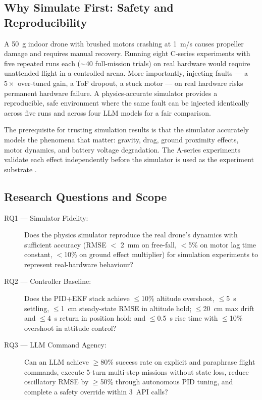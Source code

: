 \subsection{Why Simulate First: Safety and Reproducibility}
\label{sec:ch3_problem_sim}

A 50~g indoor drone with brushed motors crashing at 1~m/s causes propeller
damage and requires manual recovery. Running eight C-series experiments with
five repeated runs each ($\sim$40 full-mission trials) on real hardware would
require unattended flight in a controlled arena. More importantly, injecting
faults --- a $5\times$ over-tuned gain, a ToF dropout, a stuck motor ---
on real hardware risks permanent hardware failure. A physics-accurate simulator
provides a reproducible, safe environment where the same fault can be injected
identically across five runs and across four LLM models for a fair comparison.

The prerequisite for trusting simulation results is that the simulator accurately
models the phenomena that matter: gravity, drag, ground proximity effects, motor
dynamics, and battery voltage degradation. The A-series experiments validate
each effect independently before the simulator is used as the experiment
substrate \cite{forster2015crazyflie, faessler2018differential}.

\subsection{Research Questions and Scope}
\label{sec:ch3_problem_rq}

\begin{description}
  \item[RQ1 --- Simulator Fidelity:] Does the physics simulator reproduce
    the real drone's dynamics with sufficient accuracy (RMSE $<$ 2~mm on
    free-fall, $<$5\% on motor lag time constant, $<$10\% on ground effect
    multiplier) for simulation experiments to represent real-hardware behaviour?
  \item[RQ2 --- Controller Baseline:] Does the PID+EKF stack achieve
    $\leq$10\% altitude overshoot, $\leq$5~s settling, $\leq$1~cm steady-state
    RMSE in altitude hold; $\leq$20~cm max drift and $\leq$4~s return in
    position hold; and $\leq$0.5~s rise time with $\leq$10\% overshoot in
    attitude control?
  \item[RQ3 --- LLM Command Agency:] Can an LLM achieve $\geq$80\% success
    rate on explicit and paraphrase flight commands, execute 5-turn multi-step
    missions without state loss, reduce oscillatory RMSE by $\geq$50\% through
    autonomous PID tuning, and complete a safety override within 3~API calls?
\end{description}


